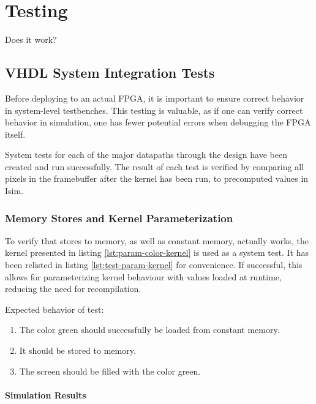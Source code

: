 \documentclass[../main/report.tex]{subfiles}
\begin{document}
\chapter{Testing}

Does it work?

\section{VHDL System Integration Tests}

Before deploying to an actual FPGA, it is important to ensure correct behavior in system-level testbenches.
This testing is valuable, as if one can verify correct behavior in simulation, one has fewer potential errors when debugging the FPGA itself.

System tests for each of the major datapaths through the design have been created and run successfully.
The result of each test is verified by comparing all pixels in the framebuffer after the kernel has been run, to precomputed values in Isim.

\subsection{Memory Stores and Kernel Parameterization}

To verify that stores to memory, as well as constant memory, actually works, the kernel presented in listing \ref{lst:param-color-kernel} is used as a system test.
It has been relisted in listing \ref{lst:test-param-kernel} for convenience.
If successful, this allows for parameterizing kernel behaviour with values loaded at runtime, reducing the need for recompilation.


Expected behavior of test:
\begin{enumerate}
  \item
    The color green should successfully be loaded from constant memory.
  \item
    It should be stored to memory.
  \item
    The screen should be filled with the color green.
\end{enumerate}

\subsubsection*{Simulation Results}
\end{document}
